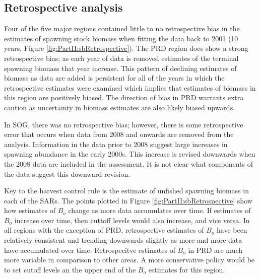 \subsection{Retrospective analysis}
Four of the five major regions contained little to no retrospective bias in the estimates of spawning stock biomass when fitting the data back to 2001 (10 years, Figure \ref{fig:PartII:sbRetrospective}).  The PRD region does show a strong retrospective bias; as each year of data is removed estimates of the terminal spawning biomass that year increase.  This pattern of declining estimates of biomass as data are added is persistent for all of the years in which the retrospective estimates were examined which implies that estimates of biomass in this region are positively biased.  The direction of bias in PRD warrants extra caution as uncertainty in biomass estimates are also likely biased upwards.

In SOG, there was no retrospective bias; however, there is some retrospective error that occurs when data from 2008 and onwards are removed from the analysis. Information in the data prior to 2008 suggest large increases in spawning abundance in the early 2000s.  This increase is revised downwards when the 2008 data are included in the assessment.  It is not clear what components of the data suggest this downward revision.  

Key to the harvest control rule is the estimate of unfished spawning biomass in each of the SARs.  The points plotted in Figure \ref{fig:PartII:sbRetrospective} show how estimates of $B_o$ change as more data accumulates over time.  If estimates of $B_o$ increase over time, then cuttoff levels would also increase, and vice versa.  In all regions with the exception of PRD, retrospective estimates of $B_o$ have been relatively consistent and trending downwards slightly as more and more data have accumulated over time.  Retrospecitve estimates of $B_o$ in PRD are much more variable in comparison to other areas. A more conservative policy would be to set cutoff levels an the upper end of the $B_o$ estimates for this region.


